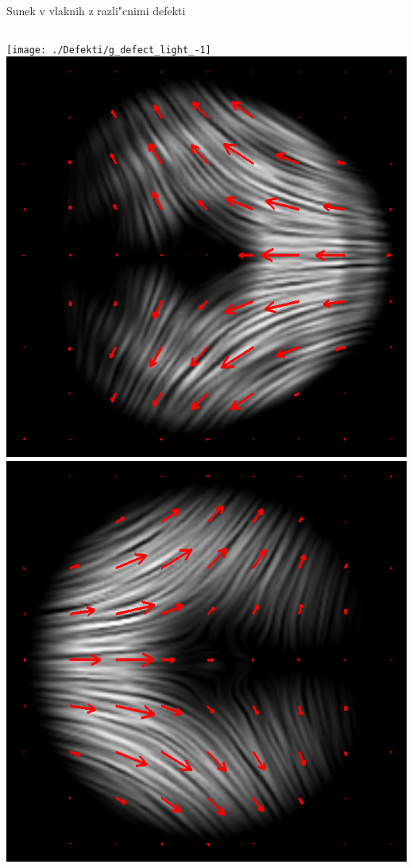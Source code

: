 \documentclass{beamer}
\begin{document}
\begin{frame}{Sunek v vlaknih z razli"cnimi defekti}
\begin{columns}
\centering
  \texttt{[image: ./Defekti/g\_defect\_light\_-1]} \\[2mm]
  \includegraphics[width=\textwidth]{./Slike/licp_m12_68} \\[2mm]
  \includegraphics[width=\textwidth]{./Slike/licp_m12_78}
  

\end{columns}
\end{frame}
\end{document}
